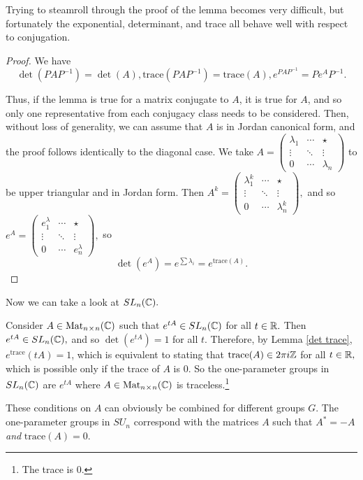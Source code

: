 Trying to steamroll through the proof of the lemma becomes very difficult, but fortunately the exponential, determinant, and trace all behave well with respect to conjugation. 

\begin{proof}
We have 
\[
\det(PAP^{-1}) = \det(A), \text{trace}(PAP^{-1}) = \text{trace}(A), e^{PAP^{-1}} = Pe^AP^{-1}.
\]

Thus, if the lemma is true for a matrix conjugate to $A$, it is true for $A$, and so only one representative from each conjugacy class needs to be considered. Then, without loss of generality, we can assume that $A$ is in Jordan canonical form, and the proof follows identically to the diagonal case. We take
$
A = \begin{pmatrix} \lambda_1 & \cdots & \star \\ \vdots & \ddots & \vdots \\ 0 &\cdots  & \lambda_n\end{pmatrix}
$
to be upper triangular and in Jordan form. Then 
$
A^k = \begin{pmatrix} \lambda_1^k & \cdots & \star \\ \vdots & \ddots & \vdots \\ 0 &\cdots  & \lambda_n^k\end{pmatrix},
$
and so
$
e^A = \begin{pmatrix} e^\lambda_1 & \cdots & \star \\ \vdots & \ddots & \vdots \\ 0 &\cdots  & e^\lambda_n\end{pmatrix},
$
so 
\[
\det(e^A) = e^{\sum \lambda_i} = e^{\text{trace}(A)}.
\]
\end{proof}

Now we can take a look at $SL_n(\mathbb C).$

\begin{example}
Consider $A \in \text{Mat}_{n \hspace{0.05em}{\times}\hspace{0.05em} n}(\mathbb C)$  such that $e^{tA}  \in SL_n(\mathbb C)$ for all $t \in\mathbb R.$ Then $e^{tA} \in SL_n(\mathbb C),$ and so $\det(e^{tA}) = 1$ for all $t.$ Therefore, by Lemma \ref{det trace}, $e^\text{trace}(tA) = 1$, which is equivalent to stating that $\text{trace}(A) \in 2\pi i \mathbb Z$ for all $ t \in \mathbb R,$ which is possible only if the trace of $A$ is 0. So the one-parameter groups in $SL_n(\mathbb C)$ are $e^{tA}$ where $A \in \text{Mat}_{n \hspace{0.05em}{\times}\hspace{0.05em} n}(\mathbb C)$ is traceless.\footnote{The trace is 0.}
\end{example}

These conditions on $A$ can obviously be combined for different groups $G$. The one-parameter groups in $SU_n$ correspond with the matrices $A$ such that $A^* = -A$ \emph{and} $\text{trace}(A) = 0.$

